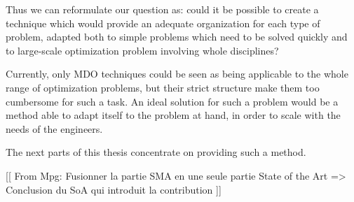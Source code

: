 Thus we can reformulate our question as: could it be possible to create a technique which would provide an adequate organization for each type of problem, adapted both to simple problems which need to be solved quickly and to large-scale optimization problem involving whole disciplines?

Currently, only MDO techniques could be seen as being applicable to the whole range of optimization problems, but their strict structure make them too cumbersome for such a task.
An ideal solution for such a problem would be a method able to adapt itself to the problem at hand, in order to scale with the needs of the engineers.

The next parts of this thesis concentrate on providing such a method.

[[ From Mpg: 
	Fusionner la partie SMA en une seule partie State of the Art
	=> Conclusion du SoA qui introduit la contribution
]]

